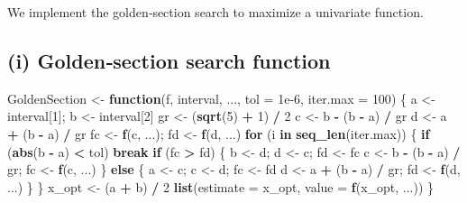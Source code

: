 \documentclass[
]{article}
\newenvironment{Shaded}{\begin{snugshade}}{\end{snugshade}}
\newcommand{\AttributeTok}[1]{\textcolor[rgb]{0.13,0.29,0.53}{#1}}
\newcommand{\ControlFlowTok}[1]{\textcolor[rgb]{0.13,0.29,0.53}{\textbf{#1}}}
\newcommand{\DecValTok}[1]{\textcolor[rgb]{0.00,0.00,0.81}{#1}}
\newcommand{\FloatTok}[1]{\textcolor[rgb]{0.00,0.00,0.81}{#1}}
\newcommand{\FunctionTok}[1]{\textcolor[rgb]{0.13,0.29,0.53}{\textbf{#1}}}
\newcommand{\NormalTok}[1]{#1}
\newcommand{\OtherTok}[1]{\textcolor[rgb]{0.56,0.35,0.01}{#1}}
\newcommand{\SpecialCharTok}[1]{\textcolor[rgb]{0.81,0.36,0.00}{\textbf{#1}}}
\begin{document}
We implement the golden‐section search to maximize a univariate
function.

\subsection{(i) Golden‐section search
function}\label{i-goldensection-search-function}

\begin{Shaded}
\begin{Highlighting}[]
\NormalTok{GoldenSection }\OtherTok{\textless{}{-}} \ControlFlowTok{function}\NormalTok{(f, interval, ..., }\AttributeTok{tol =} \FloatTok{1e{-}6}\NormalTok{, }\AttributeTok{iter.max =} \DecValTok{100}\NormalTok{) \{}
\NormalTok{  a }\OtherTok{\textless{}{-}}\NormalTok{ interval[}\DecValTok{1}\NormalTok{]; b }\OtherTok{\textless{}{-}}\NormalTok{ interval[}\DecValTok{2}\NormalTok{]}
\NormalTok{  gr }\OtherTok{\textless{}{-}}\NormalTok{ (}\FunctionTok{sqrt}\NormalTok{(}\DecValTok{5}\NormalTok{) }\SpecialCharTok{+} \DecValTok{1}\NormalTok{) }\SpecialCharTok{/} \DecValTok{2}
\NormalTok{  c }\OtherTok{\textless{}{-}}\NormalTok{ b }\SpecialCharTok{{-}}\NormalTok{ (b }\SpecialCharTok{{-}}\NormalTok{ a) }\SpecialCharTok{/}\NormalTok{ gr}
\NormalTok{  d }\OtherTok{\textless{}{-}}\NormalTok{ a }\SpecialCharTok{+}\NormalTok{ (b }\SpecialCharTok{{-}}\NormalTok{ a) }\SpecialCharTok{/}\NormalTok{ gr}
\NormalTok{  fc }\OtherTok{\textless{}{-}} \FunctionTok{f}\NormalTok{(c, ...); fd }\OtherTok{\textless{}{-}} \FunctionTok{f}\NormalTok{(d, ...)}
  \ControlFlowTok{for}\NormalTok{ (i }\ControlFlowTok{in} \FunctionTok{seq\_len}\NormalTok{(iter.max)) \{}
    \ControlFlowTok{if}\NormalTok{ (}\FunctionTok{abs}\NormalTok{(b }\SpecialCharTok{{-}}\NormalTok{ a) }\SpecialCharTok{\textless{}}\NormalTok{ tol) }\ControlFlowTok{break}
    \ControlFlowTok{if}\NormalTok{ (fc }\SpecialCharTok{\textgreater{}}\NormalTok{ fd) \{}
\NormalTok{      b }\OtherTok{\textless{}{-}}\NormalTok{ d; d }\OtherTok{\textless{}{-}}\NormalTok{ c; fd }\OtherTok{\textless{}{-}}\NormalTok{ fc}
\NormalTok{      c }\OtherTok{\textless{}{-}}\NormalTok{ b }\SpecialCharTok{{-}}\NormalTok{ (b }\SpecialCharTok{{-}}\NormalTok{ a) }\SpecialCharTok{/}\NormalTok{ gr; fc }\OtherTok{\textless{}{-}} \FunctionTok{f}\NormalTok{(c, ...)}
\NormalTok{    \} }\ControlFlowTok{else}\NormalTok{ \{}
\NormalTok{      a }\OtherTok{\textless{}{-}}\NormalTok{ c; c }\OtherTok{\textless{}{-}}\NormalTok{ d; fc }\OtherTok{\textless{}{-}}\NormalTok{ fd}
\NormalTok{      d }\OtherTok{\textless{}{-}}\NormalTok{ a }\SpecialCharTok{+}\NormalTok{ (b }\SpecialCharTok{{-}}\NormalTok{ a) }\SpecialCharTok{/}\NormalTok{ gr; fd }\OtherTok{\textless{}{-}} \FunctionTok{f}\NormalTok{(d, ...)}
\NormalTok{    \}}
\NormalTok{  \}}
\NormalTok{  x\_opt }\OtherTok{\textless{}{-}}\NormalTok{ (a }\SpecialCharTok{+}\NormalTok{ b) }\SpecialCharTok{/} \DecValTok{2}
  \FunctionTok{list}\NormalTok{(}\AttributeTok{estimate =}\NormalTok{ x\_opt, }\AttributeTok{value =} \FunctionTok{f}\NormalTok{(x\_opt, ...))}
\NormalTok{\}}
\end{Highlighting}
\end{Shaded}
\end{document}
